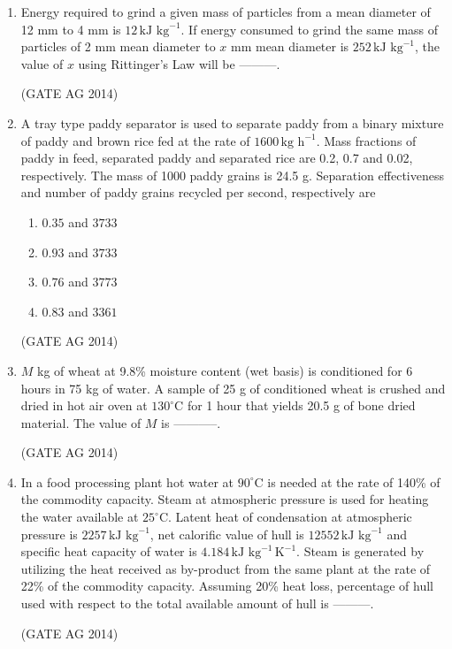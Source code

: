 \documentclass[journal,12pt,onecolumn]{IEEEtran}
\begin{document}
\begin{enumerate}
\item Energy required to grind a given mass of particles from a mean diameter of 12 mm to 4 mm is 
$12 \, \text{kJ kg}^{-1}$.  
If energy consumed to grind the same mass of particles of 2 mm mean diameter to $x$ mm mean diameter 
is $252 \, \text{kJ kg}^{-1}$, the value of $x$ using Rittinger’s Law will be 
---------.

\hfill(GATE AG 2014)

\item A tray type paddy separator is used to separate paddy from a binary mixture of paddy and brown 
rice fed at the rate of $1600 \, \text{kg h}^{-1}$.  
Mass fractions of paddy in feed, separated paddy and separated rice are 0.2, 0.7 and 0.02, respectively.  
The mass of 1000 paddy grains is 24.5 g.  
Separation effectiveness and number of paddy grains recycled per second, respectively are

\begin{multicols}{2}
\begin{enumerate}
\item $0.35$ and $3733$  
\item $0.93$ and $3733$  
\item $0.76$ and $3773$  
\item $0.83$ and $3361$  
\end{enumerate}
\end{multicols}
\hfill(GATE AG 2014)

\item $M$ kg of wheat at 9.8\% moisture content (wet basis) is conditioned for 6 hours in 75 kg of water.  
A sample of 25 g of conditioned wheat is crushed and dried in hot air oven at $130^\circ$C for 1 hour 
that yields 20.5 g of bone dried material.  
The value of $M$ is -----------.

\hfill(GATE AG 2014)

\item In a food processing plant hot water at $90^\circ$C is needed at the rate of 140\% of the commodity capacity.  
Steam at atmospheric pressure is used for heating the water available at $25^\circ$C.  
Latent heat of condensation at atmospheric pressure is $2257 \, \text{kJ kg}^{-1}$,  
net calorific value of hull is $12552 \, \text{kJ kg}^{-1}$ and specific heat capacity of water is 
$4.184 \, \text{kJ kg}^{-1} \, \text{K}^{-1}$.  
Steam is generated by utilizing the heat received as by-product from the same plant at the rate of 
22\% of the commodity capacity.  
Assuming 20\% heat loss, percentage of hull used with respect to the total available amount of hull is ---------.

\hfill(GATE AG 2014)

    

\end{enumerate}
\end{document}
